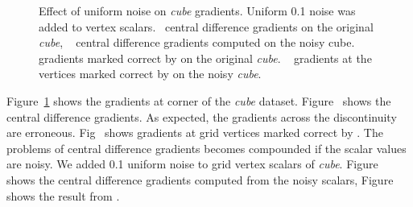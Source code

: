 \begin{figure}[ht]
    \centering
    \vspace{-3mm}
    \caption{Effect of uniform noise on \textit{cube} gradients. Uniform 0.1 noise was added to vertex scalars.~\protect{} central difference gradients on the original \textit{cube}, ~\protect{}  central difference gradients computed on the noisy cube.
    ~\protect{}  gradients marked correct by \protect\ReliGrad on the original \textit{cube}. ~\protect{} gradients at the vertices marked correct by \protect\ReliGrad on the noisy \textit{cube}. }
    \label{fig:cube:noise}
\end{figure}
Figure~\ref{fig:cube:noise} shows the gradients at corner of the \textit{cube} dataset.
Figure~ shows the central difference gradients. As expected, the gradients across the discontinuity are erroneous.
Fig~ shows gradients at grid vertices marked correct by \protect\ReliGrad.
The problems of central difference gradients becomes compounded if the scalar values are noisy. We added 0.1 uniform noise to grid vertex scalars of \emph{cube}. Figure~ shows the central difference  gradients computed from the noisy scalars, Figure~ shows the result from \ReliGrad.
